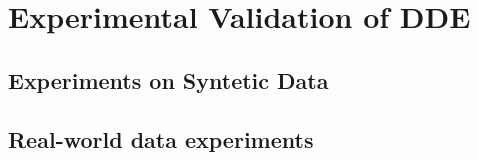 \chapter{Experimental Validation of DDE}
\label{sec:evaluation}


\lipsum[4]

\section{Experiments on Syntetic Data}

\section{Real-world data experiments}

\lipsum[4]
